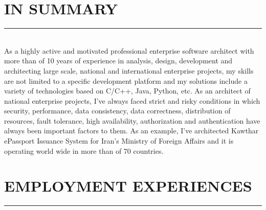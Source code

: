 \documentclass[10pt,a4paper]{article}
\begin{document}
\thispagestyle{fancy}

\section{IN SUMMARY}
\noindent \rule {3.5cm}{0.4pt} \\
As a highly active and motivated professional enterprise software architect with more than of 10 years of experience in analysis, design, development and architecting large scale, national and international enterprise projects, my skills are not limited to a specific development platform and my solutions include a variety of technologies based on C/C++, Java, Python, etc. As an architect of national enterprise projects, I've always faced strict and risky conditions in which security, performance, data consistency, data correctness, distribution of resources, fault tolerance, high availability, authorization and authentication have always been important factors to them. As an example, I've architected Kawthar ePassport Issuance System for Iran's Ministry of Foreign Affairs and it is operating world wide in more than of 70 countries.

\section{EMPLOYMENT EXPERIENCES}
\noindent \rule {7.3cm}{0.4pt}
\end{document}
